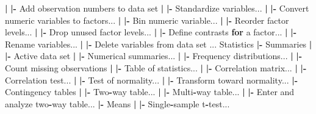 \documentclass[12pt,]{krantz}
\newenvironment{Shaded}{\begin{snugshade}}{\end{snugshade}}
\newcommand{\ControlFlowTok}[1]{\textcolor[rgb]{0.13,0.29,0.53}{\textbf{#1}}}
\newcommand{\ErrorTok}[1]{\textcolor[rgb]{0.64,0.00,0.00}{\textbf{#1}}}
\newcommand{\NormalTok}[1]{#1}
\newcommand{\OperatorTok}[1]{\textcolor[rgb]{0.81,0.36,0.00}{\textbf{#1}}}
\newcommand{\StringTok}[1]{\textcolor[rgb]{0.31,0.60,0.02}{#1}}
\begin{document}
\begin{Shaded}
\begin{Highlighting}[]
  \OperatorTok{|}\StringTok{ }\ErrorTok{|}\OperatorTok{-}\StringTok{ }\NormalTok{Add observation numbers to data set}
  \OperatorTok{|}\StringTok{ }\ErrorTok{|}\OperatorTok{-}\StringTok{ }\NormalTok{Standardize variables...}
  \OperatorTok{|}\StringTok{ }\ErrorTok{|}\OperatorTok{-}\StringTok{ }\NormalTok{Convert numeric variables to factors...}
  \OperatorTok{|}\StringTok{ }\ErrorTok{|}\OperatorTok{-}\StringTok{ }\NormalTok{Bin numeric variable...}
  \OperatorTok{|}\StringTok{ }\ErrorTok{|}\OperatorTok{-}\StringTok{ }\NormalTok{Reorder factor levels...}
  \OperatorTok{|}\StringTok{ }\ErrorTok{|}\OperatorTok{-}\StringTok{ }\NormalTok{Drop unused factor levels...}
  \OperatorTok{|}\StringTok{ }\ErrorTok{|}\OperatorTok{-}\StringTok{ }\NormalTok{Define contrasts }\ControlFlowTok{for}\NormalTok{ a factor...}
  \OperatorTok{|}\StringTok{ }\ErrorTok{|}\OperatorTok{-}\StringTok{ }\NormalTok{Rename variables...}
  \OperatorTok{|}\StringTok{ }\ErrorTok{|}\OperatorTok{-}\StringTok{ }\NormalTok{Delete variables from data set ...}
\NormalTok{Statistics}
  \OperatorTok{|-}\StringTok{ }\NormalTok{Summaries}
  \OperatorTok{|}\StringTok{ }\ErrorTok{|}\OperatorTok{-}\StringTok{ }\NormalTok{Active data set}
  \OperatorTok{|}\StringTok{ }\ErrorTok{|}\OperatorTok{-}\StringTok{ }\NormalTok{Numerical summaries...}
  \OperatorTok{|}\StringTok{ }\ErrorTok{|}\OperatorTok{-}\StringTok{ }\NormalTok{Frequency distributions...}
  \OperatorTok{|}\StringTok{ }\ErrorTok{|}\OperatorTok{-}\StringTok{ }\NormalTok{Count missing observations}
  \OperatorTok{|}\StringTok{ }\ErrorTok{|}\OperatorTok{-}\StringTok{ }\NormalTok{Table of statistics...}
  \OperatorTok{|}\StringTok{ }\ErrorTok{|}\OperatorTok{-}\StringTok{ }\NormalTok{Correlation matrix...}
  \OperatorTok{|}\StringTok{ }\ErrorTok{|}\OperatorTok{-}\StringTok{ }\NormalTok{Correlation test...}
  \OperatorTok{|}\StringTok{ }\ErrorTok{|}\OperatorTok{-}\StringTok{ }\NormalTok{Test of normality...}
  \OperatorTok{|}\StringTok{ }\ErrorTok{|}\OperatorTok{-}\StringTok{ }\NormalTok{Transform toward normality...}
  \OperatorTok{|-}\NormalTok{Contingency tables}
  \OperatorTok{|}\StringTok{ }\ErrorTok{|}\OperatorTok{-}\StringTok{ }\NormalTok{Two}\OperatorTok{-}\NormalTok{way table...}
  \OperatorTok{|}\StringTok{ }\ErrorTok{|}\OperatorTok{-}\StringTok{ }\NormalTok{Multi}\OperatorTok{-}\NormalTok{way table...}
  \OperatorTok{|}\StringTok{ }\ErrorTok{|}\OperatorTok{-}\StringTok{ }\NormalTok{Enter and analyze two}\OperatorTok{-}\NormalTok{way table...}
  \OperatorTok{|-}\StringTok{ }\NormalTok{Means}
  \OperatorTok{|}\StringTok{ }\ErrorTok{|}\OperatorTok{-}\StringTok{ }\NormalTok{Single}\OperatorTok{-}\NormalTok{sample t}\OperatorTok{-}\NormalTok{test...}

\end{Highlighting}
\end{Shaded}
\end{document}
